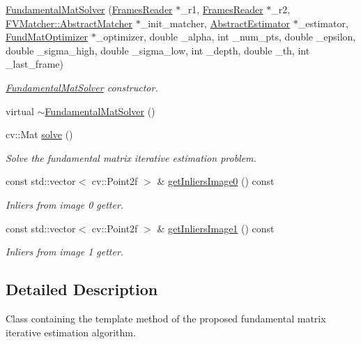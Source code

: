 \begin{DoxyCompactItemize}
\item 
\hyperlink{classFundamentalMatSolver_a499f89d03b8a4c64737da228fcee4793}{Fundamental\+Mat\+Solver} (\hyperlink{classFramesReader}{Frames\+Reader} $\ast$\+\_\+r1, \hyperlink{classFramesReader}{Frames\+Reader} $\ast$\+\_\+r2, \hyperlink{classFVMatcher_1_1AbstractMatcher}{F\+V\+Matcher\+::\+Abstract\+Matcher} $\ast$\+\_\+init\+\_\+matcher, \hyperlink{classAbstractEstimator}{Abstract\+Estimator} $\ast$\+\_\+estimator, \hyperlink{classFundMatOptimizer}{Fund\+Mat\+Optimizer} $\ast$\+\_\+optimizer, double \+\_\+alpha, int \+\_\+num\+\_\+pts, double \+\_\+epsilon, double \+\_\+sigma\+\_\+high, double \+\_\+sigma\+\_\+low, int \+\_\+depth, double \+\_\+th, int \+\_\+last\+\_\+frame)
\begin{DoxyCompactList}\small\item\em \hyperlink{classFundamentalMatSolver}{Fundamental\+Mat\+Solver} constructor. \end{DoxyCompactList}\item 
virtual \hyperlink{classFundamentalMatSolver_a15aff405ed4f1670053c83bfca672149}{$\sim$\+Fundamental\+Mat\+Solver} ()
\item 
cv\+::\+Mat \hyperlink{classFundamentalMatSolver_aaa14f6188fecb5c16a7df7009503d72d}{solve} ()
\begin{DoxyCompactList}\small\item\em Solve the fundamental matrix iterative estimation problem. \end{DoxyCompactList}\item 
const std\+::vector$<$ cv\+::\+Point2f $>$ \& \hyperlink{classFundamentalMatSolver_a572160dbf6b86cf73d286ccb7e4e16db}{get\+Inliers\+Image0} () const 
\begin{DoxyCompactList}\small\item\em Inliers from image 0 getter. \end{DoxyCompactList}\item 
const std\+::vector$<$ cv\+::\+Point2f $>$ \& \hyperlink{classFundamentalMatSolver_aa76b13f602843bbbeb8d558f324bf9df}{get\+Inliers\+Image1} () const 
\begin{DoxyCompactList}\small\item\em Inliers from image 1 getter. \end{DoxyCompactList}\end{DoxyCompactItemize}


\subsection{Detailed Description}
Class containing the template method of the proposed fundamental matrix iterative estimation algorithm. 

